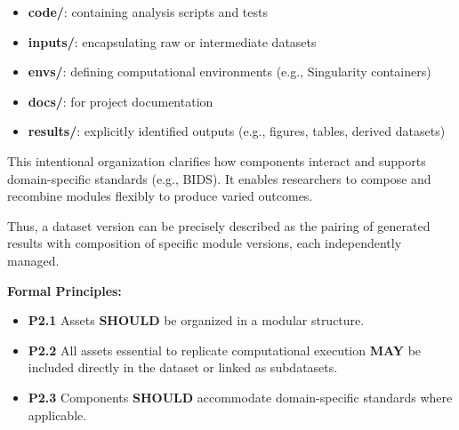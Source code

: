 \documentclass{article}
\begin{document}
\begin{itemize}
  \item \textbf{code/}: containing analysis scripts and tests
  \item \textbf{inputs/}: encapsulating raw or intermediate datasets
  \item \textbf{envs/}: defining computational environments (e.g., Singularity containers)
  \item \textbf{docs/}: for project documentation
  \item \textbf{results/}: explicitly identified outputs (e.g., figures, tables, derived datasets)
\end{itemize}

This intentional organization clarifies how components interact and supports domain-specific standards (e.g., BIDS).
It enables researchers to compose and recombine modules flexibly to produce varied outcomes.


Thus, a dataset version can be precisely described as the pairing of generated results with composition of specific module versions, each independently managed.


\textbf{Formal Principles:}

\begin{itemize}
  \item \textbf{P2.1} Assets \textbf{SHOULD} be organized in a modular structure.
  \item \textbf{P2.2} All assets essential to replicate computational execution \textbf{MAY} be included directly in the dataset or linked as subdatasets.
  \item \textbf{P2.3} Components \textbf{SHOULD} accommodate domain-specific standards where applicable.
\end{itemize}
\end{document}
